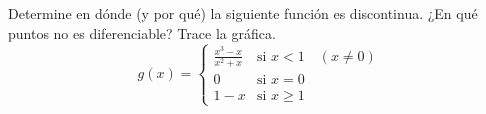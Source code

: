 \item Determine en dónde (y por qué) la siguiente función es discontinua. ¿En qué puntos no es diferenciable? Trace la gráfica.
    $$g(x) = \begin{cases} 
    \frac{x^3 - x}{x^2 + x} & \text{si } x < 1 \quad (x \ne 0) \\ 
    0 & \text{si } x = 0 \\ 
    1 - x & \text{si } x \ge 1 
    \end{cases}$$
